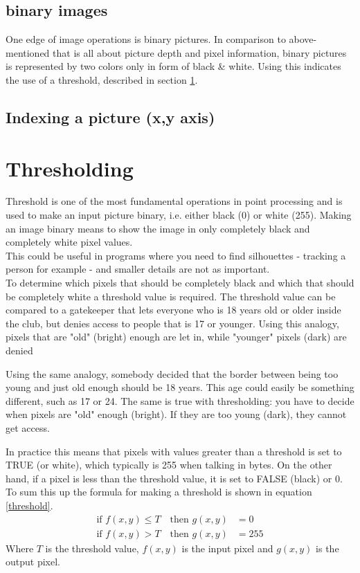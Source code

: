 \subsection{binary images}
One edge of image operations is binary pictures. In comparison to above-mentioned that is all about picture depth and pixel information, binary pictures is represented by two colors only in form of black & white. Using this indicates the use of a threshold, described in section \ref{sec:thresholding}.

\subsection{Indexing a picture (x,y axis)}

   


\section{Thresholding}
\label{sec:thresholding}
Threshold is one of the most fundamental operations in point processing  and is used to make an input picture binary, i.e. either black (0) or white (255). Making an image binary means to show the image in only completely black and completely white pixel values. \\
This could be useful in programs where you need to find silhouettes - tracking a person for example - and smaller details are not as important. \\
To determine which pixels that should be completely black and which that should be completely white a threshold value is required. The threshold value can be compared to a gatekeeper that lets everyone who is 18 years old or older inside the club, but denies access to people that is 17 or younger. Using this analogy, pixels that are "old" (bright) enough are let in, while "younger" pixels (dark) are denied

Using the same analogy, somebody decided that the border between being too young and just old enough should be 18 years. This age could easily be something different, such as 17 or 24. The same is true with thresholding: you have to decide when pixels are "old" enough (bright). If they are too young (dark), they cannot get access.

In practice this means that pixels with values greater than a threshold is set to TRUE (or white), which typically is 255 when talking in bytes. On the other hand, if a pixel is less than the threshold value, it is set to FALSE (black) or 0. To sum this up the formula for making a threshold is shown in equation \ref{threshold}.
\begin{equation}
  \begin{aligned}
  	\text{if } f(x,y)\leq T \quad \text{then } g(x,y)&= 0 \\
  	\text{if } f(x,y)>T \quad \text{then } g(x,y)&= 255
	\label{threshold}  
  \end{aligned} 
\end{equation}
Where $T$ is the threshold value, $f(x,y)$ is the input pixel and $g(x,y)$ is the output pixel. 

